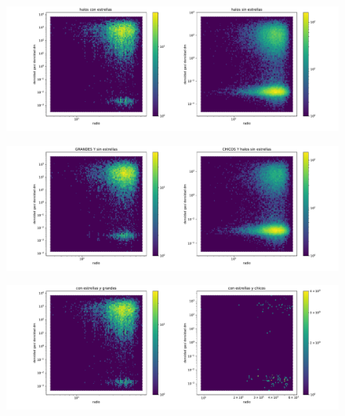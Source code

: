 \begin{figure}[h]
\centering
\includegraphics[width=18cm]{Figures/R_sctFRACC2.pdf}
\decoRule
\caption[perfil del void R]{}
\label{fig:Electron}
\end{figure}

\begin{figure}[h]
\centering
\includegraphics[width=18cm]{Figures/R_sctFRACC3.pdf}
\decoRule
\caption[perfil del void R]{}
\label{fig:Electron}
\end{figure}

\begin{figure}[h]
\centering
\includegraphics[width=18cm]{Figures/R_sctFRACC4.pdf}
\decoRule
\caption[perfil del void R]{}
\label{fig:Electron}
\end{figure}


